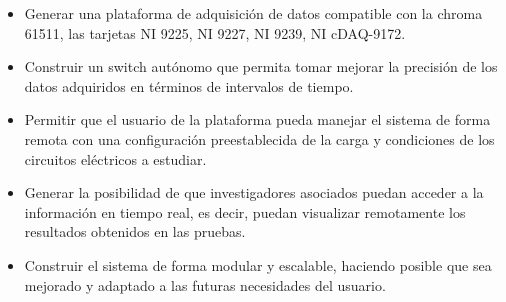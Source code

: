 \begin{itemize}

\item Generar una plataforma de adquisición de datos compatible con la chroma 61511, las tarjetas NI 9225, NI 9227, NI 9239, NI cDAQ-9172.   

\item Construir un switch autónomo que permita tomar  mejorar la precisión de los datos adquiridos en términos de intervalos de tiempo. 
\item Permitir que el usuario de la plataforma pueda manejar el sistema de forma remota con una configuración preestablecida de la carga y condiciones de los circuitos eléctricos a estudiar.

\item Generar la posibilidad de que investigadores asociados puedan acceder a la información en tiempo real, es decir, puedan visualizar remotamente los resultados obtenidos en las pruebas.

\item Construir el sistema de forma modular y escalable, haciendo posible que sea mejorado y adaptado a las futuras necesidades del usuario. 

\end{itemize}








